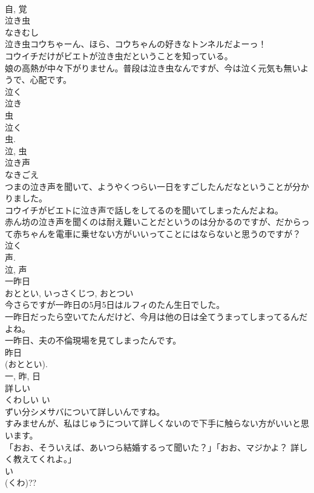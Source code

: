 \documentclass[8pt]{extreport}
\begin{document}
\begin{CJK}{UTF8}{min}
\\	自, 覚	
\\	泣き虫	
\\	なきむし	
\\	泣き虫コウちゃーん、ほら、コウちゃんの好きなトンネルだよーっ！	
\\	コウイチだけがビエトが泣き虫だということを知っている。	
\\	娘の高熱が中々下がりません。普段は泣き虫なんですが、今は泣く元気も無いようで、心配です。	
\\	泣く 
\\	泣き 
\\	虫 
\\	泣く 
\\	虫. 
\\	泣, 虫	
\\	泣き声	
\\	なきごえ	
\\	つまの泣き声を聞いて、ようやくつらい一日をすごしたんだなということが分かりました。	
\\	コウイチがビエトに泣き声で話しをしてるのを聞いてしまったんだよね。	
\\	赤ん坊の泣き声を聞くのは耐え難いことだというのは分かるのですが、だからって赤ちゃんを電車に乗せない方がいいってことにはならないと思うのですが？	
\\	泣く 
\\	声. 
\\	泣, 声	
\\	一昨日	
\\	おととい, いっさくじつ, おとつい	
\\	今さらですが一昨日の5月5日はルフィのたん生日でした。	
\\	一昨日だったら空いてたんだけど、今月は他の日は全てうまってしまってるんだよね。	
\\	一昨日、夫の不倫現場を見てしまったんです。	
\\	昨日 
\\	(おととい). 
\\	一, 昨, 日	
\\	詳しい	
\\	くわしい	い 
\\	ずい分シメサバについて詳しいんですね。	
\\	すみませんが、私はじゅうについて詳しくないので下手に触らない方がいいと思います。	
\\	「おお、そういえば、あいつら結婚するって聞いた？」「おお、マジかよ？ 詳しく教えてくれよ。」	
\\	い 
\\	(くわ)?? 

\end{CJK}
\end{document}
